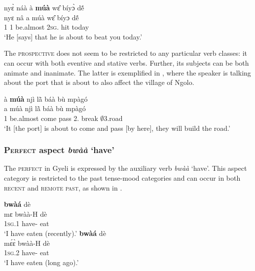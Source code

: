 \ea\label{Rmua2}
  \glll  nyɛ̀ náà à {\bfseries múà} wɛ̂ bíyɔ̀ dẽ́ \\
        nyɛ nâ a múà wɛ̂ bíyɔ dẽ́\\
           1 {\COMP} 1 be.almost 2\textsc{sg}.{\OBJ} hit today\\
    \trans `He [says] that he is about to beat you today.'
\z


The \textsc{prospective} does not seem to be restricted to any particular verb classes: it can occur with both eventive and stative verbs. Further, its subjects can be both animate and inanimate. The latter is exemplified in , where the speaker is talking about the port that is about to also affect the village of Ngolo.

\ea\label{muab}
  \glll à {\bfseries múà} njì lã̀ báà bù mpàgó \\
       a múà njì lã̀ báà bù mpàgó \\
        1 be.almost come pass 2.{\FUT} break $\emptyset$3.road\\
    \trans `It [the port] is about to come and pass [by here], they will build the road.'
\z










\subsubsection{\textsc{Perfect} aspect {\itshape bwàà} `have'}
\label{sec:PSTPRF}

The \textsc{perfect} in Gyeli is expressed by the auxiliary verb {\itshape bwàà} `have'. This aspect category is restricted to the past tense-mood categories and can occur in both \textsc{recent} and \textsc{remote past}, as shown in .

\ea\label{bwaa1}
\ea\label{bwaa1a}
   {\bfseries bwàá} dè \\
            mɛ bwàà-H dè \\
             1\textsc{sg}.{\PST}1  have-{\R} eat\\
    \trans `I have eaten (recently).'
\ex\label{bwaa1b}
   {\bfseries bwàá} dè \\
            mɛ́ɛ̀ bwàà-H dè \\
             1\textsc{sg}.{\PST}2 have-{\R} eat\\
    \trans `I have eaten (long ago).'
\z
\z


